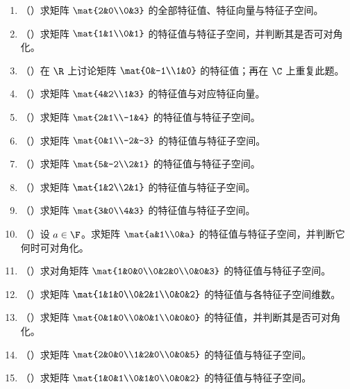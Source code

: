 \begin{enumerate}[label=\arabic*., leftmargin=2.8em]
  \item （\basic）求矩阵 \(\mat{2&0\\0&3}\) 的全部特征值、特征向量与特征子空间。
  \item （\basic）求矩阵 \(\mat{1&1\\0&1}\) 的特征值与特征子空间，并判断其是否可对角化。
  \item （\basic）在 \(\R\) 上讨论矩阵 \(\mat{0&-1\\1&0}\) 的特征值；再在 \(\C\) 上重复此题。
  \item （\basic）求矩阵 \(\mat{4&2\\1&3}\) 的特征值与对应特征向量。
  \item （\basic）求矩阵 \(\mat{2&1\\-1&4}\) 的特征值与特征子空间。
  \item （\basic）求矩阵 \(\mat{0&1\\-2&-3}\) 的特征值与特征子空间。
  \item （\basic）求矩阵 \(\mat{5&-2\\2&1}\) 的特征值与特征子空间。
  \item （\basic）求矩阵 \(\mat{1&2\\2&1}\) 的特征值与特征子空间。
  \item （\basic）求矩阵 \(\mat{3&0\\4&3}\) 的特征值与特征子空间。
  \item （\basic）设 \(a\in \F\)。求矩阵 \(\mat{a&1\\0&a}\) 的特征值与特征子空间，并判断它何时可对角化。
  \item （\basic）求对角矩阵 \(\mat{1&0&0\\0&2&0\\0&0&3}\) 的特征值与特征子空间。
  \item （\basic）求矩阵 \(\mat{1&1&0\\0&2&1\\0&0&2}\) 的特征值与各特征子空间维数。
  \item （\basic）求矩阵 \(\mat{0&1&0\\0&0&1\\0&0&0}\) 的特征值，并判断其是否可对角化。
  \item （\basic）求矩阵 \(\mat{2&0&0\\1&2&0\\0&0&5}\) 的特征值与特征子空间。
  \item （\basic）求矩阵 \(\mat{1&0&1\\0&1&0\\0&0&2}\) 的特征值与特征子空间。

\end{enumerate}
